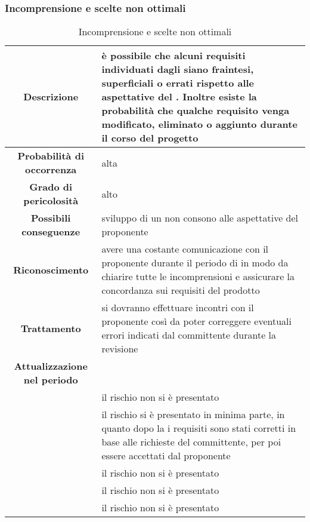 \documentclass[PianoDiProgetto.tex]{subfiles}
\begin{document}
		\subsubsection{Incomprensione e scelte non ottimali}
			\label{sec:lr}
\begin{table}[h]
		\begin{center}
			\begin{tabular}{ | c | p{10cm} |}
				\hline


		 \textbf{Descrizione} & è possibile che alcuni requisiti individuati dagli \ANP{} siano fraintesi, superficiali o errati rispetto alle aspettative del \gl{proponente} \PROPONENTE{}. Inoltre esiste la probabilità che qualche requisito venga modificato, eliminato o aggiunto durante il corso del progetto \\ \hline
		 \textbf{Probabilità di occorrenza} & alta \\ \hline
		 \textbf{Grado di pericolosità} & alto \\ \hline
		 \textbf{Possibili conseguenze} & sviluppo di un \gl{prodotto} non consono alle aspettative del proponente \\ \hline
		 \textbf{Riconoscimento} & avere una costante comunicazione con il proponente \PROPONENTE{} durante il periodo di \ARdoc{} in modo da chiarire tutte le incomprensioni e assicurare la concordanza sui requisiti del prodotto \\ \hline
		 \textbf{Trattamento} & si dovranno effettuare incontri con il proponente \PROPONENTE{} così da poter correggere eventuali errori indicati dal committente durante la revisione \\ \hline
		 \textbf{Attualizzazione nel periodo}&

				\\ \hline \textbf{\PerAR} & il rischio non si è presentato
				\\ \hline \textbf{\PerAD}& il rischio si è presentato in minima parte, in quanto dopo la  \RR{} i requisiti sono stati corretti in base alle richieste del committente, per poi essere accettati dal proponente
				\\ \hline \textbf{\PerPA}& il rischio non si è presentato
				\\ \hline \textbf{\PerPD}& il rischio non si è presentato
				\\ \hline \textbf{\PerC}& il rischio non si è presentato \\ \hline

\end{tabular}
		\caption{Incomprensione e scelte non ottimali}
		\end{center}
	\end{table}
\end{document}
